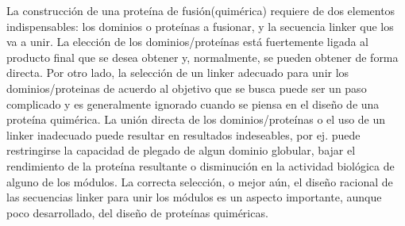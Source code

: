 
La construcción de una proteína de fusión(quimérica) requiere de dos elementos indispensables: 
los dominios o proteínas a fusionar, y la secuencia linker que los va a unir.
La elección de los dominios/proteínas está fuertemente ligada al producto final que se desea obtener y, normalmente, se pueden obtener de forma directa.
Por otro lado, la selección de un linker adecuado para unir los dominios/proteinas de acuerdo al objetivo que se busca puede ser un paso complicado y es generalmente ignorado cuando se piensa en el diseño de una proteína quimérica.
La unión directa de los dominios/proteínas o el uso de un linker inadecuado puede resultar en resultados indeseables, por ej. puede restringirse la capacidad de plegado de algun dominio globular, bajar el rendimiento de la proteína resultante o
disminución en la actividad biológica de alguno de los módulos.
La correcta selección, o mejor aún, el diseño racional de las secuencias linker para unir los módulos es un aspecto importante, aunque poco desarrollado, del diseño de proteínas quiméricas. 

